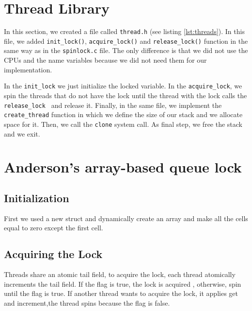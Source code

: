 \documentclass[10pt]{scrartcl}
\begin{document}
\section{Thread Library}\label{sec:threads}
In this section, we created a file called \texttt{thread.h} (see listing \ref{lst:threads}). In this file, we added \texttt{init\_lock()}, \texttt{acquire\_lock()} and \texttt{release\_lock()} function in the same way as in the \texttt{spinlock.c} file. The only difference is that we did not use the CPUs and the name variables because we did not need them for our implementation.

In the \texttt{init\_lock} we just initialize the locked variable. In the \texttt{acquire\_lock}, we spin the threads that do not have the lock until the thread with the lock calls the \texttt{release\_lock } and release it.
Finally, in the same file, we implement the \texttt{create\_thread} function in which we define the size of our stack and we allocate space for it. Then, we call the \texttt{clone} system call. As final step, we free the stack and we exit. 


\FloatBarrier

\section{Anderson's array-based queue lock}

\subsection{Initialization}
First we used a new struct and dynamically create an array and make all the cells equal to zero except the first cell.


\subsection{Acquiring the Lock}
Threads share an atomic tail field, to acquire the lock, each thread atomically increments the tail field.  If the flag is true, the lock is acquired , otherwise, spin until the flag is true. If another thread wants to acquire the lock, it applies get and increment,the thread spins because the flag is false.
\end{document}
